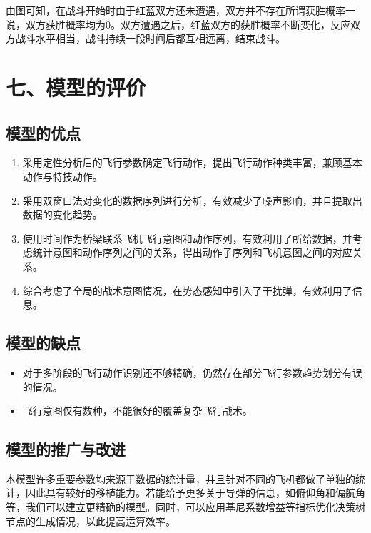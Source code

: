 \documentclass{my_paper}
\begin{document}
由图可知，在战斗开始时由于红蓝双方还未遭遇，双方并不存在所谓获胜概率一说，双方获胜概率均为0。双方遭遇之后，红蓝双方的获胜概率不断变化，反应双方战斗水平相当，战斗持续一段时间后都互相远离，结束战斗。


\section{七、模型的评价}


\subsection{模型的优点}
\begin{enumerate}
    \item 采用定性分析后的飞行参数确定飞行动作，提出飞行动作种类丰富，兼顾基本动作与特技动作。
    \item 采用双窗口法对变化的数据序列进行分析，有效减少了噪声影响，并且提取出数据的变化趋势。
    \item 使用时间作为桥梁联系飞机飞行意图和动作序列，有效利用了所给数据，并考虑统计意图和动作序列之间的关系，得出动作子序列和飞机意图之间的对应关系。
    \item 综合考虑了全局的战术意图情况，在势态感知中引入了干扰弹，有效利用了信息。

\end{enumerate}

\subsection{模型的缺点}
\begin{itemize}
    \item 对于多阶段的飞行动作识别还不够精确，仍然存在部分飞行参数趋势划分有误的情况。
    \item 飞行意图仅有数种，不能很好的覆盖复杂飞行战术。
\end{itemize}

\subsection{模型的推广与改进}

本模型许多重要参数均来源于数据的统计量，并且针对不同的飞机都做了单独的统计，因此具有较好的移植能力。若能给予更多关于导弹的信息，如俯仰角和偏航角等，我们可以建立更精确的模型。同时，可以应用基尼系数增益等指标优化决策树节点的生成情况，以此提高运算效率。
\newpage
\begin{center}
\end{center}
\end{document}
